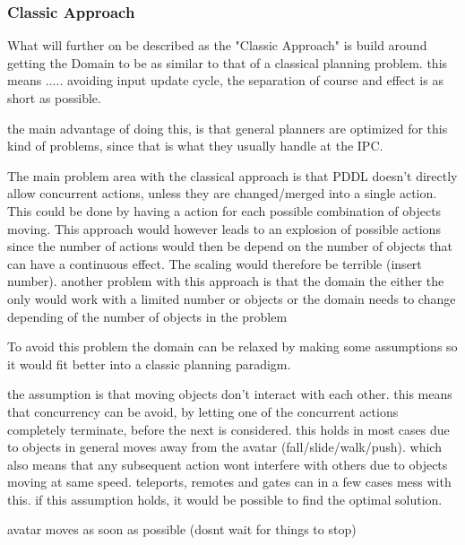 		
		
		\subsubsection{Classic Approach}
		What will further on be described as the "Classic Approach" is build around getting the Domain to be as similar to that of a classical planning problem. 
		this means ..... avoiding input update cycle, the separation of course and effect is as short as possible.
		
		
		the main advantage of doing this, is that general planners are optimized for this kind of problems, since that is what they  usually handle at the IPC.
		
		The main problem area with the classical approach is that PDDL doesn't directly allow concurrent actions, unless they are changed/merged into a single action. This could be done by having a action for each possible combination of objects moving. This approach would however leads to an explosion of possible actions since the number of actions would then be depend on the number of objects that can have a continuous effect. The scaling would therefore be terrible (insert number). another problem with this approach is that the domain the either the only would work with a limited number or objects or the domain needs to change depending of the number of objects in the problem
		
		
		To avoid this problem the domain can be relaxed by making some assumptions so it would fit better into a classic planning paradigm. 
		
		the assumption is that moving objects don't interact with each other. this means that concurrency can be avoid, by letting one of the concurrent actions completely terminate, before the next is considered. %
		this holds in most cases due to objects in general moves away from the avatar (fall/slide/walk/push). which also means that any subsequent action wont interfere with others due to objects moving at same speed. teleports, remotes and gates can in a few cases mess with this. if this assumption holds, it would be possible to find the optimal solution.
		
		
		avatar moves as soon as possible (dosnt wait for things to stop)
		
